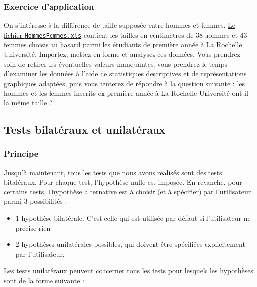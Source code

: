 \documentclass[a4paperpaper,]{article}
\providecommand{\tightlist}{%
  \setlength{\itemsep}{0pt}\setlength{\parskip}{0pt}}
\begin{document}
\hypertarget{exercice-dapplication-2}{%
\subsubsection{Exercice d'application}\label{exercice-dapplication-2}}

On s'intéresse à la différence de taille supposée entre hommes et femmes. \href{https://besibo.github.io/Biometrie3/data/HommesFemmes.xls}{Le fichier \texttt{HommesFemmes.xls}} contient les tailles en centimètres de 38 hommes et 43 femmes choisis au hasard parmi les étudiants de première année à La Rochelle Université. Importez, mettez en forme et analysez ces données. Vous prendrez soin de retirer les éventuelles valeurs manquantes, vous prendrez le temps d'examiner les données à l'aide de statistiques descriptives et de représentations graphiques adaptées, puis vous tenterez de répondre à la question suivante : les hommes et les femmes inscrits en première année à La Rochelle Université ont-il la même taille ?

\hypertarget{tests-bilatuxe9raux-et-unilatuxe9raux}{%
\subsection{Tests bilatéraux et unilatéraux}\label{tests-bilatuxe9raux-et-unilatuxe9raux}}

\hypertarget{principe}{%
\subsubsection{Principe}\label{principe}}

Jusqu'à maintenant, tous les tests que nous avons réalisés sont des tests bitaléraux. Pour chaque test, l'hypothèse nulle est imposée. En revanche, pour certains tests, l'hypothèse alternative est à choisir (et à spécifier) par l'utilisateur parmi 3 possibilités :

\begin{itemize}
\tightlist
\item
  1 hypothèse bilatérale. C'est celle qui est utilisée par défaut si l'utilisateur ne précise rien.
\item
  2 hypothèses unilatérales possibles, qui doivent être spécifiées explicitement par l'utilisateur.
\end{itemize}

Les tests unilatéraux peuvent concerner tous les tests pour lesquels les hypothèses sont de la forme suivante :
\end{document}
